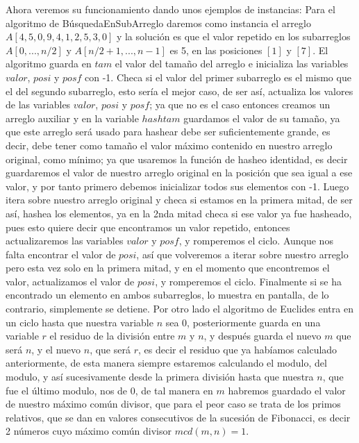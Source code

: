 \documentclass[12pt,twoside]{article}
\begin{document}
Ahora veremos su funcionamiento dando unos ejemplos de instancias:
\newline
Para el algoritmo de B\'usquedaEnSubArreglo daremos como instancia el arreglo $A[4,5,0,9,4,1,2,5,3,0]$ y la soluci\'on es que el valor repetido en los subarreglos $A[0,..., n/2] $ y $A[n/2 + 1, ..., n-1]$ es 5, en las posiciones $[1]$ y $[7]$.
El algoritmo guarda en $tam$ el valor del tamaño del arreglo e inicializa las variables $valor$, $posi$ y $posf$ con -1. Checa si el valor del primer subarreglo es el mismo que el del segundo subarreglo, esto ser\'ia el mejor caso, de ser as\'i, actualiza los valores de las variables $valor$, $posi$ y $posf$; ya que no es el caso entonces creamos un arreglo auxiliar y en la variable $hashtam$ guardamos el valor de su tamaño, ya que este arreglo ser\'a usado para hashear debe ser suficientemente grande, es decir, debe tener como tamaño el valor m\'aximo contenido en nuestro arreglo original, como m\'inimo; ya que usaremos la funci\'on de hasheo identidad, es decir guardaremos el valor de nuestro arreglo original en la posici\'on que sea igual a ese valor, y por tanto primero debemos inicializar todos sus elementos con -1.
Luego itera sobre nuestro arreglo original y checa si estamos en la primera mitad, de ser as\'i, hashea los elementos, ya en la 2nda mitad checa si ese valor ya fue hasheado, pues esto quiere decir que encontramos un valor repetido, entonces actualizaremos las variables $valor$ y $posf$, y romperemos el ciclo. Aunque nos falta encontrar el valor de $posi$, as\'i que volveremos a iterar sobre nuestro arreglo pero esta vez solo en la primera mitad, y en el momento que encontremos el valor, actualizamos el valor de $posi$, y romperemos el ciclo.
Finalmente si se ha encontrado un elemento en ambos subarreglos, lo muestra en pantalla, de lo contrario, simplemente se detiene.
\newline
\newline
Por otro lado el algoritmo de Euclides entra en un ciclo hasta que nuestra variable $n$ sea 0, 
posteriormente guarda en una variable $r$ el residuo de la divisi\'on entre $m$ y $n$, y despu\'es guarda el nuevo $m$ que ser\'a $n$, y el nuevo $n$, que ser\'a $r$, es decir el residuo que ya hab\'iamos calculado anteriormente, de esta manera siempre estaremos calculando el modulo, del modulo, y as\'i sucesivamente desde la primera divisi\'on hasta que nuestra $n$, que fue el \'ultimo modulo, nos de 0, de tal manera en $m$ habremos guardado el valor de nuestro m\'aximo com\'un divisor, que para el peor caso se trata de los primos relativos, que se dan en valores consecutivos de la sucesi\'on de Fibonacci, es decir 2 n\'umeros cuyo m\'aximo com\'un divisor $mcd(m,n) = 1$.
\newpage
\end{document}
